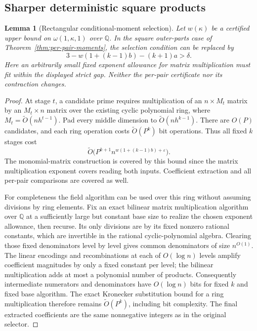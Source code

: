 \documentclass[11pt]{article}
\newtheorem{lemma}[theorem]{Lemma}
\begin{document}
\subsection*{Sharper deterministic square products}
\begin{lemma}[Rectangular conditional-moment selection]
\label{lem:rectangular-moment-selection}
Let $w(\kappa)$ be a certified upper bound on
$\omega(1,\kappa,1)$ over $\mathbb Q$. In the square outer-parts case of
Theorem~\ref{thm:per-pair-moments}, the selection condition can be replaced by
\[
3-w(1+(k-1)b)-(k+1)a>\delta.
\]
Here an arbitrarily small fixed exponent allowance for matrix multiplication
must fit within the displayed strict gap. Neither the per-pair certificate
nor its contraction changes.
\end{lemma}
\begin{proof}
At stage $t$, a candidate prime requires multiplication of an
$n\times M_t$ matrix by an $M_t\times n$ matrix over the existing cyclic
polynomial ring, where $M_t=\widetilde O(nh^{t-1})$. Pad every middle
dimension to $\widetilde O(nh^{k-1})$. There are $O(P)$ candidates, and each
ring operation costs $\widetilde O(P^k)$ bit operations. Thus all fixed
$k$ stages cost
\[
\widetilde O\bigl(P^{k+1}n^{w(1+(k-1)b)+\varepsilon}\bigr).
\]
The monomial-matrix construction is covered by this bound since the matrix
multiplication exponent covers reading both inputs. Coefficient extraction
and all per-pair comparisons are covered as well.

For completeness the field algorithm can be used over this ring without
assuming divisions by ring elements. Fix an exact bilinear matrix
multiplication algorithm over $\mathbb Q$ at a sufficiently large but
constant base size to realize the chosen exponent allowance, then recurse.
Its only divisions are by its fixed nonzero rational constants, which are
invertible in the rational cyclic-polynomial algebra. Clearing those fixed
denominators level by level gives common denominators of size
$n^{O(1)}$. The linear encodings and recombinations at each of $O(\log n)$
levels amplify coefficient magnitudes by only a fixed constant per level;
the bilinear multiplication adds at most a polynomial number of products.
Consequently intermediate numerators and denominators have $O(\log n)$
bits for fixed $k$ and fixed base algorithm. The exact Kronecker
substitution bound for a ring multiplication therefore remains
$\widetilde O(P^k)$, including bit complexity. The final extracted
coefficients are the same nonnegative integers as in the original selector.
\end{proof}
\end{document}
